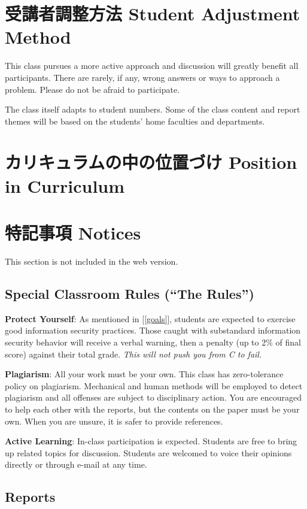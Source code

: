 \documentclass{article}
\begin{document}
\section{受講者調整方法 Student Adjustment Method}
This class pursues a more active approach and discussion will greatly benefit all participants. There are rarely, if any, wrong answers or ways to approach a problem. Please do not be afraid to participate.

The class itself adapts to student numbers. Some of the class content and report themes will be based on the students' home faculties and departments.

\section{カリキュラムの中の位置づけ Position in Curriculum}
\section{特記事項 Notices}
This section is not included in the web version.

\subsection{Special Classroom Rules (``The Rules'')}

\textbf{Protect Yourself}: As mentioned in [\ref{goals}], students are expected to exercise good information security practices. Those caught with substandard information security behavior will receive a verbal warning, then a penalty (up to 2\% of final score) against their total grade. \textit{This will not push you from C to fail.}

\smallskip\noindent
\textbf{Plagiarism}: All your work must be your own. This class has zero-tolerance policy on plagiarism. Mechanical and human methods will be employed to detect plagiarism and all offenses are subject to disciplinary action. You are encouraged to help each other with the reports, but the contents on the paper must be your own. When you are unsure, it is safer to provide references.

\smallskip\noindent
\textbf{Active Learning}: In-class participation is expected. Students are free to bring up related topics for discussion. Students are welcomed to voice their opinions directly or through e-mail at any time.

\subsection{Reports}
\end{document}
